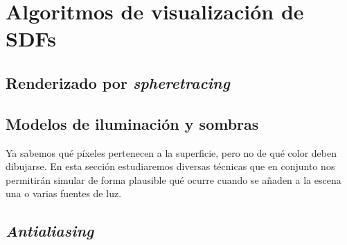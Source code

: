 \chapter{Algoritmos de visualización de SDFs}\label{cap:2}

\section{Renderizado por \textit{spheretracing}}\label{sec:render}


\section{Modelos de iluminación y sombras}\label{sec:ilum}
Ya sabemos qué píxeles pertenecen a la superficie, pero no de qué color deben dibujarse. En esta sección estudiaremos diversas técnicas que en conjunto nos permitirán simular de forma plausible qué ocurre cuando se añaden a la escena una o varias fuentes de luz.






\section{\textit{Antialiasing}}

